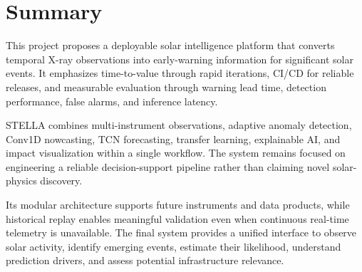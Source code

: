 \documentclass[10pt,a4paper]{article}
\begin{document}

\section{Summary}

This project proposes a deployable solar intelligence platform that converts temporal
X-ray observations into early-warning information for significant solar events. It
emphasizes time-to-value through rapid iterations, CI/CD for reliable releases, and
measurable evaluation through warning lead time, detection performance, false alarms,
and inference latency.

STELLA combines multi-instrument observations, adaptive anomaly detection, Conv1D
nowcasting, TCN forecasting, transfer learning, explainable AI, and impact
visualization within a single workflow. The system remains focused on engineering
a reliable decision-support pipeline rather than claiming novel solar-physics
discovery.

Its modular architecture supports future instruments and data products, while
historical replay enables meaningful validation even when continuous real-time
telemetry is unavailable. The final system provides a unified interface to observe
solar activity, identify emerging events, estimate their likelihood, understand
prediction drivers, and assess potential infrastructure relevance.
\end{document}
